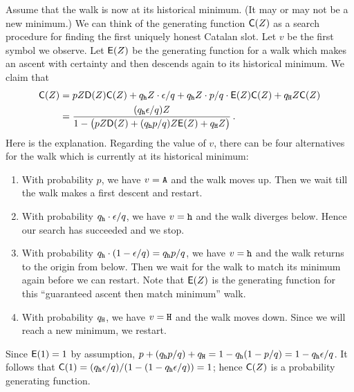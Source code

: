   Assume that the walk is now at its historical minimum. 
  (It may or may not be a new minimum.)
  We can think of the generating function $\mathsf{C}(Z)$ as a search procedure 
  for finding the first uniquely honest Catalan slot. 
  Let $v$ be the first symbol we observe. 
  Let $\mathsf{E}(Z)$ be the generating function for a walk which 
  makes an ascent with certainty 
  and then descends again to its historical minimum.
  We claim that 
  \begin{align}
    \gfC(Z) 
      &= pZ \gfD(Z) \gfC(Z) + q_\h Z\cdot \epsilon/q + q_\h Z \cdot p/q \cdot \gfE(Z) \gfC(Z) + q_\H Z \gfC(Z) \nonumber
      \\
      &= \frac{(q_\h \epsilon/q) Z}{1 - \bigl( pZ \gfD(Z) + (q_\h p/q) Z \gfE(Z) + q_\H Z\bigr)}      %
    \label{eq:gfC}
    \,.
  \end{align}
  Here is the explanation. 
  Regarding the value of $v$, there can be four alternatives 
  for the walk which is currently at its historical minimum: 
  \begin{enumerate}[label=(\textit{\roman*})]
    \item With probability $p$, we have $v = \mathtt{A}$ and the walk moves up. 
    Then we wait till the walk makes a first descent and restart.

    \item With probability $q_{\mathtt{h}} \cdot  \epsilon/q$, we have 
    $v = \mathtt{h}$ and the walk diverges below. 
    Hence our search has succeeded and we stop.

    \item With probability $q_{\mathtt{h}} \cdot  (1 - \epsilon/q) = q_{\mathtt{h}} p/q$, we have 
    $v = \mathtt{h}$ and the walk returns to the origin from below. 
    Then we wait for the walk to match its minimum again 
    before we can restart. 
    Note that $\mathsf{E}(Z)$ is 
    the generating function for this ``guaranteed ascent then match minimum'' walk.

    \item With probability $q_{\mathtt{H}}$, we have $v = \mathtt{H}$ and the walk moves down. 
    Since we will reach a new minimum, we restart.
  \end{enumerate}
  Since $\mathsf{E}(1) = 1$ by assumption, 
  $p  + (q_{\mathtt{h}} p/q) + q_{\mathtt{H}} = 1 - q_{\mathtt{h}}(1 - p/q) = 1 - q_{\mathtt{h}}\epsilon/q$. 
  It follows that 
  $\mathsf{C}(1) = (q_{\mathtt{h}} \epsilon/q) / (1 -(1 - q_{\mathtt{h}}\epsilon/q) ) = 1$; 
  hence $\mathsf{C}(Z)$ is a probability generating function.    

